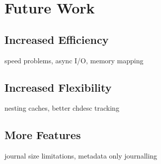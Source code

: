 \section{Future Work}
\label{sec:future}

\subsection{Increased Efficiency}
speed problems, async I/O, memory mapping
\subsection{Increased Flexibility}
nesting caches, better chdesc tracking
\subsection{More Features}
journal size limitations, metadata only journalling
